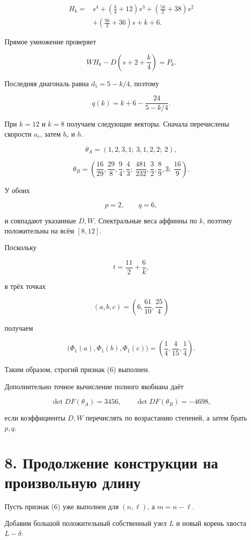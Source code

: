 \documentclass[11pt,a4paper]{article}
\begin{document}
\[
\begin{aligned}
H_k={}&s^4+\left(\frac k4+12\right)s^3
+\left(\frac{5k}{2}+38\right)s^2\\
&+\left(\frac{9k}{2}+36\right)s+k+6.
\end{aligned}
\]

Прямое умножение проверяет

\[
WH_k-D\left(s+2+\frac k4\right)=P_k.
\]

Последняя диагональ равна \(d_5=5-k/4\), поэтому

\[
q(k)=k+6-\frac{24}{5-k/4}.
\]

При \(k=12\) и \(k=8\) получаем следующие векторы. Сначала перечислены скорости \(a_r\), затем \(b_r\) и \(h\).

\[
\theta_A=(1,2,3,1;\ 3,1,2,2;\ 2),
\]

\[
\theta_B=
\left(
\frac{16}{29},\frac{29}{8},\frac94,\frac43;\
\frac{481}{232},\frac32,\frac89,3;\
\frac{16}{9}
\right).
\]

У обоих

\[
p=2,\qquad q=6,
\]

и совпадают указанные \(D,W\). Спектральные веса аффинны по \(k\), поэтому положительны на всём \([8,12]\).

Поскольку

\[
t=\frac{11}{2}+\frac6k,
\]

в трёх точках

\[
(a,b,c)=\left(6,\frac{61}{10},\frac{25}{4}\right)
\]

получаем

\[
\bigl(\Phi_1(a),\Phi_1(b),\Phi_1(c)\bigr)
=
\left(\frac14,\frac4{15},\frac14\right).
\]

Таким образом, строгий признак (6) выполнен.

Дополнительно точное вычисление полного якобиана даёт

\[
\det DF(\theta_A)=3456,\qquad
\det DF(\theta_B)=-4698,
\]

если коэффициенты \(D,W\) перечислять по возрастанию степеней, а затем брать \(p,q\).

\section*{\color{ink} 8. Продолжение конструкции на произвольную длину}

Пусть признак (6) уже выполнен для \((n,\ell)\), а \(m=n-\ell\).

Добавим большой положительный собственный узел \(L\) и новый корень хвоста \(L-\delta\):
\end{document}
